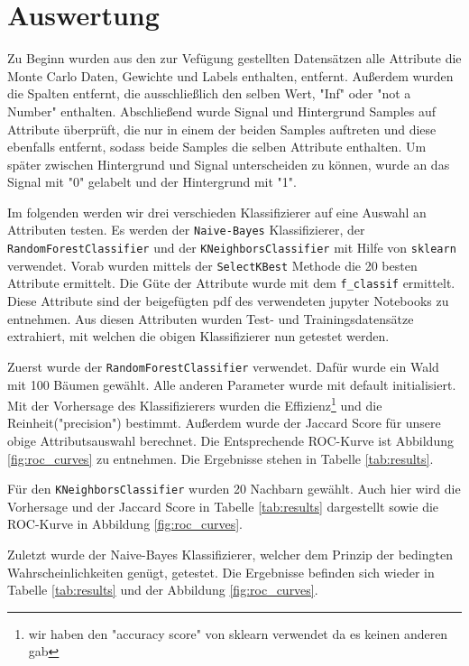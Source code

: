 \section{Auswertung}
\label{sec:auswertung}

Zu Beginn wurden aus den zur Vef\"ugung gestellten Datens\"atzen alle Attribute die Monte Carlo Daten, Gewichte und Labels enthalten, entfernt. Au\ss erdem wurden die Spalten entfernt, die ausschlie\ss lich den selben Wert, "Inf" oder "not a Number" enthalten.
Abschlie\ss end wurde Signal und Hintergrund Samples auf Attribute \"uberpr\"uft, die nur in einem der beiden Samples auftreten und diese ebenfalls entfernt, sodass beide Samples die selben Attribute enthalten.
Um sp\"ater zwischen Hintergrund und Signal unterscheiden zu k\"onnen, wurde an das Signal mit "0" gelabelt und der Hintergrund mit "1".

Im folgenden werden wir drei verschieden Klassifizierer auf eine Auswahl an Attributen testen. Es werden der \texttt{Naive-Bayes} Klassifizierer, der \texttt{RandomForestClassifier} und der \texttt{KNeighborsClassifier} mit Hilfe von \texttt{sklearn} verwendet.
Vorab wurden mittels der \texttt{SelectKBest} Methode die 20 besten Attribute ermittelt. Die G\"ute der Attribute wurde mit dem \texttt{f\_classif} ermittelt.
Diese Attribute sind der beigef\"ugten pdf des verwendeten jupyter Notebooks zu entnehmen.
Aus diesen Attributen wurden Test- und Trainingsdatens\"atze extrahiert, mit welchen die obigen Klassifizierer nun getestet werden.

Zuerst wurde der \texttt{RandomForestClassifier} verwendet. 
Dafür wurde ein Wald mit 100 B\"aumen gew\"ahlt. Alle anderen Parameter wurde mit default initialisiert.
Mit der Vorhersage des Klassifizierers wurden die Effizienz\footnote{wir haben den "accuracy score" von sklearn verwendet da es keinen anderen gab} und die Reinheit("precision") bestimmt.
Au\ss erdem wurde der Jaccard Score f\"ur unsere obige Attributsauswahl berechnet. Die Entsprechende ROC-Kurve ist Abbildung \ref{fig:roc_curves} zu entnehmen.
Die Ergebnisse stehen in Tabelle \ref{tab:results}.

F\"ur den \texttt{KNeighborsClassifier} wurden 20 Nachbarn gew\"ahlt. Auch hier wird die Vorhersage und der Jaccard Score in Tabelle \ref{tab:results} dargestellt sowie die ROC-Kurve in Abbildung \ref{fig:roc_curves}.

Zuletzt wurde der Naive-Bayes Klassifizierer, welcher dem Prinzip der bedingten Wahrscheinlichkeiten gen\"ugt, getestet.
Die Ergebnisse befinden sich wieder in Tabelle \ref{tab:results} und der Abbildung \ref{fig:roc_curves}.

